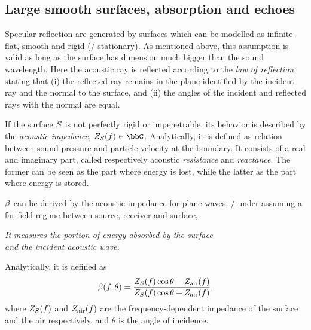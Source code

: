 \subsection{Large smooth surfaces, absorption and echoes}
Specular reflection are generated by surfaces which can be modelled as infinite flat, smooth and rigid (\ie/ stationary).
As mentioned above, this assumption is valid as long as the surface has dimension much bigger than the sound wavelength.
Here the acoustic ray is reflected according to the \textit{law of reflection}, stating that
(i) the reflected ray remains in the plane identified by the incident ray and the normal to the surface,
and (ii) the angles of the incident and reflected rays with the normal are equal.

If the surface $S$ is not perfectly rigid or impenetrable, its behavior is described by the \textit{acoustic impedance}, $\impedence_\surface(f) \in \bbC$.
Analytically, it is defined as relation between sound pressure and particle velocity at the boundary.
It consists of a real and imaginary part, called respectively acoustic \textit{resistance} and \textit{reactance}.
The former can be seen as the part where energy is lost, while the latter as the part where energy is stored.

 $\beta$ can be derived by the acoustic impedance
for plane waves, \ie/ under assuming a far-field regime between source, receiver and surface,.
\begin{center}
    \textit{It measures the portion of energy absorbed by the surface
    \\and the incident acoustic wave.}
\end{center}
Analytically, it is defined as  \cite{kuttruff2016room,pierce2019acoustics}
\begin{equation}
    \beta(f, \theta) = \frac{Z_{S}(f)\cos{\theta} - Z_\text{air}(f)}{Z_{S}(f)\cos{\theta} + Z_\text{air}(f)}
    ,
\end{equation}
where $Z_{S}(f)$ and $Z_\text{air}(f)$ are the frequency-dependent impedance of the surface and the air respectively,
and $\theta$ is the angle of incidence.

